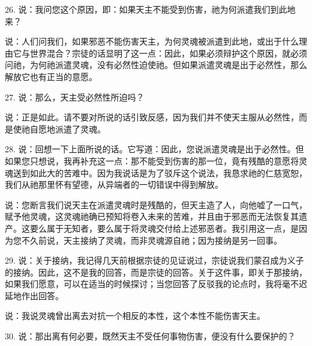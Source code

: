 26. 说：我问您这个原因，即：如果天主不能受到伤害，祂为何派遣我们到此地来？\par

说：人们问我们，如果邪恶不能伤害天主，为何灵魂被派遣到此地，或出于什么理由它与世界混合？宗徒的话显明了这一点：\newline{}因此，如果必须辩护这个原因，就必须问祂，为何祂派遣灵魂，没有必然性迫使祂。但如果派遣灵魂是出于必然性，那么解放它也有正当的意愿。\par

27. 说：那么，天主受必然性所迫吗？\par

说：正是如此。请不要对所说的话引致反感，因为我们并不使天主服从必然性，而是使祂自愿地派遣了灵魂。\par

28. 说：回想一下上面所说的话。它写道：因此，您说派遣灵魂是出于必然性。但如果您只想说，我再补充这一点：那不能受到伤害的那一位，竟有残酷的意愿将灵魂送到如此大的苦难中。因为我说话是为了驳斥这个说法，我恳求祂的仁慈宽恕，我们从祂那里怀有望德，从异端者的一切错误中得到解放。\par

说：您断言我们说天主在派遣灵魂时是残酷的，但天主造了人，向他嘘了一口气，赋予他灵魂，这灵魂祂确已预知将卷入未来的苦难，并且由于邪恶而无法恢复其遗产。这要么属于无知者，要么属于将灵魂交付给上述邪恶者。我引用这一点，是因为您不久前说，天主接纳了灵魂，而非灵魂源自祂；因为接纳是另一回事。\par

29. 说：关于接纳，我记得几天前根据宗徒的见证说过，宗徒说我们蒙召成为义子的接纳。因此，这不是我的回答，而是宗徒的回答。关于这件事，即关于那接纳，如果我们愿意，可以在适当的时候探讨；当您回答了反驳我的论点时，我将毫不迟延地作出回答。\par

说：我说灵魂曾出离去对抗一个相反的本性，这个本性不能伤害天主。\par

30. 说：那出离有何必要，既然天主不受任何事物伤害，便没有什么要保护的？\par

